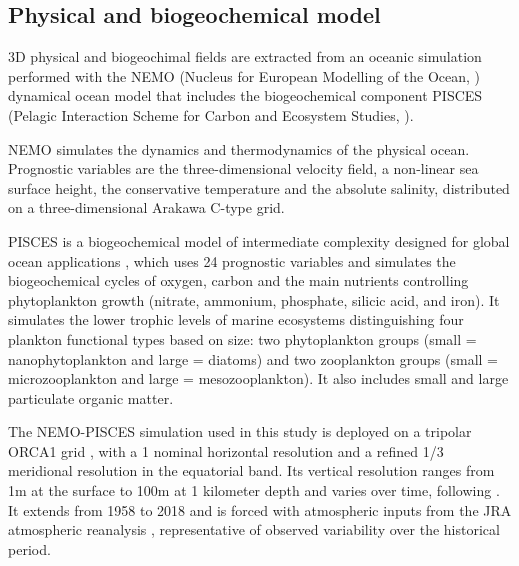 \subsection{Physical and biogeochemical model}
\label{sec:nemo}

3D physical and biogeochimal fields are extracted from an oceanic simulation performed with the NEMO (Nucleus for European Modelling of the Ocean, \citealt{madecNEMOOceanEngine2019}) dynamical ocean model that includes the biogeochemical component PISCES (Pelagic Interaction Scheme for Carbon and Ecosystem Studies, \citealt{aumontPISCESv2OceanBiogeochemical2015}). 

NEMO simulates the dynamics and thermodynamics of the physical ocean. Prognostic variables are
the three-dimensional velocity field, a non-linear sea surface height, the
conservative temperature and the absolute salinity, distributed on a three-dimensional Arakawa C-type grid.

PISCES is a biogeochemical model of intermediate complexity designed for global ocean applications \citep{aumontPISCESv2OceanBiogeochemical2015}, which uses 24 prognostic variables and simulates the biogeochemical cycles of oxygen, carbon and the main nutrients controlling phytoplankton growth (nitrate, ammonium, phosphate, silicic acid, and iron). It simulates the lower trophic levels of marine ecosystems distinguishing four plankton functional types based on size: two phytoplankton groups (small = nanophytoplankton and large = diatoms) and two zooplankton groups (small = microzooplankton and large = mesozooplankton). It also includes small and large particulate organic matter.

The NEMO-PISCES simulation used in this study is deployed on a tripolar ORCA1 grid \citep{madecGlobalOceanMesh1996}, with a 1\degree{} nominal horizontal resolution and a refined 1/3\degree{} meridional resolution in the equatorial band. Its vertical resolution ranges from 1m at the surface to 100m at 1 kilometer depth and varies over time, following \cite{levierFreeSurfaceVariable2007}. It extends from 1958 to 2018 and is forced with atmospheric inputs from the JRA atmospheric reanalysis \citep{kobayashiJRA55ReanalysisGeneral2015}, representative of observed variability over the historical period. 

